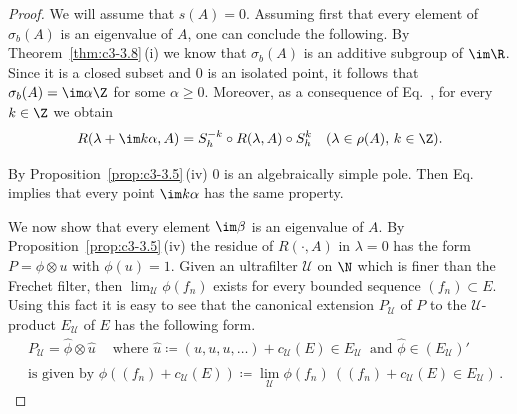 \begin{proof}
	We will assume that $s(A) = 0$.
	Assuming first that every element of\/ $\sigma_{b}(A)$ is an eigenvalue of\/ $A$, one can conclude the following.
	By Theorem~\ref{thm:c3-3.8}\,(i) we know that $\sigma_{b}(A)$ is an additive subgroup of\/ $\im\R $.
	Since it is a closed subset and $0$ is an isolated point, it follows that $\sigma_{b}(A) = \im\alpha\Z$ for some $\alpha \geq 0$.
	Moreover, as a consequence of Eq.~, for every $k \in \Z$ we obtain
	\begin{equation}\label{eq:c3-3.15}
		R(\lambda+\im k\alpha,A) = S_{h}^{-k}\circ R(\lambda,A)\circ S_{h}^{k} \quad (\lambda \in \rho(A),\, k \in \Z).
	\end{equation}
	
	By Proposition~\ref{prop:c3-3.5}\,(iv) $0$ is an algebraically simple pole.
	Then Eq.~ implies that every point $\im k\alpha$ has the same property.
	
	We now show that every element $\im\beta$ is an eigenvalue of\/ $A$.
	By Proposition~\ref{prop:c3-3.5}\,(iv) the residue of\/ $R(\cdot,A)$ in $\lambda = 0$ has the form $P = \phi\otimes u$ with $\phi(u) = 1$.
	Given an ultrafilter $\mathcal{U}$ on $\N$ which is finer than the Frechet filter, then $\lim_{\mathcal{U}}\phi(f_{n})$ exists for every bounded sequence $(f_{n}) \subset E$.
	Using this fact it is easy to see that the canonical extension $P_{\mathcal{U}}$ of\/ $P$ to the $\mathcal{U}$-product $E_{\mathcal{U}}$ of\/ $E$ has the following form.
	\begin{equation}\label{eq:c3-3.16}
		\begin{split}
		&P_{\mathcal{U}} = \hat{\phi}\otimes\hat{u} \quad \ \text{where } \hat{u} \coloneqq (u,u,u,\ldots)+c_{\mathcal{U}}(E) \in E_{\mathcal{U}} \ \text{ and } \hat{\phi} \in (E_{\mathcal{U}})'
		\\
		&\text{is given by } \hat{\phi}((f_{n})+c_{\mathcal{U}}(E)) \coloneqq \lim_{\mathcal{U}}\phi(f_{n}) \ ((f_{n})+c_{\mathcal{U}}(E) \in E_{\mathcal{U}})\,.
		\end{split}
	\end{equation}
	

\end{proof}
